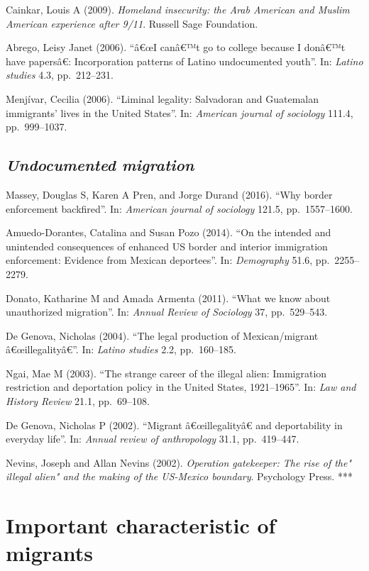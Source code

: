 \documentclass[
  12pt,
]{article}
\begin{document}
Cainkar, Louis A (2009).
\emph{Homeland insecurity: the Arab American and Muslim American experience after 9/11}.
Russell Sage Foundation.

Abrego, Leisy Janet (2006). ``â€œI canâ€™t go to college because I
donâ€™t have papersâ€: Incorporation patterns of Latino undocumented
youth''. In: \emph{Latino studies} 4.3, pp.~212--231.

Menjívar, Cecilia (2006). ``Liminal legality: Salvadoran and Guatemalan
immigrants' lives in the United States''. In:
\emph{American journal of sociology} 111.4, pp.~999--1037.

\hypertarget{undocumented-migration}{%
\subsection{\texorpdfstring{\emph{Undocumented
migration}}{Undocumented migration}}\label{undocumented-migration}}

Massey, Douglas S, Karen A Pren, and Jorge Durand (2016). ``Why border
enforcement backfired''. In: \emph{American journal of sociology} 121.5,
pp.~1557--1600.

Amuedo-Dorantes, Catalina and Susan Pozo (2014). ``On the intended and
unintended consequences of enhanced US border and interior immigration
enforcement: Evidence from Mexican deportees''. In: \emph{Demography}
51.6, pp.~2255--2279.

Donato, Katharine M and Amada Armenta (2011). ``What we know about
unauthorized migration''. In: \emph{Annual Review of Sociology} 37,
pp.~529--543.

De Genova, Nicholas (2004). ``The legal production of Mexican/migrant
â€œillegalityâ€''. In: \emph{Latino studies} 2.2, pp.~160--185.

Ngai, Mae M (2003). ``The strange career of the illegal alien:
Immigration restriction and deportation policy in the United States,
1921--1965''. In: \emph{Law and History Review} 21.1, pp.~69--108.

De Genova, Nicholas P (2002). ``Migrant â€œillegalityâ€ and
deportability in everyday life''. In:
\emph{Annual review of anthropology} 31.1, pp.~419--447.

Nevins, Joseph and Allan Nevins (2002).
\emph{Operation gatekeeper: The rise of the" illegal alien" and the making of the US-Mexico boundary}.
Psychology Press. ***

\hypertarget{important-characteristic-of-migrants}{%
\section{\texorpdfstring{\textbf{Important characteristic of
migrants}}{Important characteristic of migrants}}\label{important-characteristic-of-migrants}}
\end{document}
